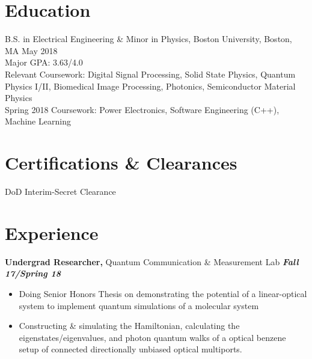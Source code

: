 \documentclass[margin]{res}
\begin{document}
 
 
\address{{\bf Present Address} \\ 39 Buswell St Apt 08 \\ Boston, MA 02215  \\
        (781) 664-7151 \\ Linkedin - www.linkedin.com/in/sonam-ghosh-a6ab09100 }
        
\address{{\bf Permanent Address} \\ 9350 Double R Blvd Apt 3814 \\ Reno, NV 89521 \\
        sonamg@bu.edu }


\begin{resume} 
 

\section{Education} 
B.S. in Electrical Engineering \& Minor in Physics, Boston University, Boston, MA \hfill May 2018 \\
Major GPA: 3.63/4.0 \\
Relevant Coursework: Digital Signal Processing, Solid State Physics, Quantum Physics I/II, Biomedical Image Processing, Photonics, Semiconductor Material Physics \\
Spring 2018 Coursework: Power Electronics, Software Engineering (C++), Machine Learning 
 
\section{Certifications \& Clearances}
DoD Interim-Secret Clearance 

\section{Experience}
{\bf Undergrad Researcher,} Quantum Communication \& Measurement Lab \hfill  \textbf{\textit{Fall 17/Spring 18}}
\begin{itemize}  pt
\item Doing Senior Honors Thesis on demonstrating the potential of a linear-optical system to implement quantum simulations of a molecular system
\item Constructing \& simulating the Hamiltonian, calculating the eigenstates/eigenvalues, and photon quantum walks of a optical benzene setup of connected directionally unbiased optical multiports.
\end{itemize}




\end{resume}
\end{document}
